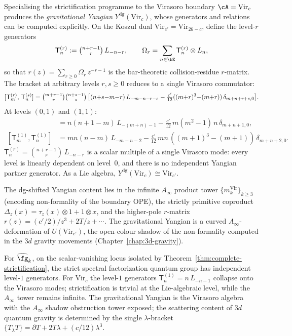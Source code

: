 \begin{remark}%
\label{rem:gravitational-yangian-explicit-brackets}%
\ClaimStatusProvedHere
Specialising the strictification programme to the Virasoro boundary
$\cA = \mathrm{Vir}_c$ produces the \emph{gravitational Yangian}
$Y^{\mathrm{dg}}(\mathrm{Vir}_c)$, whose generators and relations
can be computed explicitly. On the Koszul dual
$\mathrm{Vir}_{c'} = \mathrm{Vir}_{26-c}$, define the level-$r$
generators
\[
\mathsf{T}_n^{(r)} := \tbinom{n+r-1}{r}\,L_{-n-r},
\qquad
\Omega_r = \sum_{n \in \bZ}
\mathsf{T}_n^{(r)} \otimes L_n,
\]
so that $r(z) = \sum_{r \ge 0}\Omega_r\,z^{-r-1}$ is the bar-theoretic
collision-residue $r$-matrix. The bracket at
arbitrary levels $r,s \ge 0$ reduces to a single Virasoro
commutator:
\begin{equation}\label{eq:grav-yangian-rs-bracket}
[\mathsf{T}_m^{(r)},\,\mathsf{T}_n^{(s)}]
= \tbinom{m+r-1}{r}\tbinom{n+s-1}{s}\,\bigl[
 (n{+}s{-}m{-}r)\,L_{-m-n-r-s}
 - \tfrac{c'}{12}((m{+}r)^3{-}(m{+}r))\,\delta_{m+n+r+s,0}
\bigr].
\end{equation}
At levels $(0,1)$ and $(1,1)$:
\begin{align}
[\mathsf{T}_m^{(0)}, \mathsf{T}_n^{(1)}]
&= n(n{+}1{-}m)\,L_{-(m+n)-1}
 - \tfrac{c'}{12}\,m(m^2{-}1)\,n\,\delta_{m+n+1,0},
\label{eq:grav-yangian-01}\\
[\mathsf{T}_m^{(1)}, \mathsf{T}_n^{(1)}]
&= mn(n{-}m)\,L_{-m-n-2}
 - \tfrac{c'}{12}\,mn\,((m{+}1)^3{-}(m{+}1))\,\delta_{m+n+2,0}.
\label{eq:grav-yangian-11}
\end{align}
$\mathsf{T}_n^{(r)} = \binom{n+r-1}{r}\,L_{-n-r}$ is a scalar multiple
of a single Virasoro mode: every level is linearly dependent on
level~$0$, and there is no independent Yangian partner generator. As a
Lie algebra, $Y^{\mathrm{dg}}(\mathrm{Vir}_c) \cong \mathrm{Vir}_{c'}$.

The dg-shifted Yangian content lies in the infinite $A_\infty$ product
tower $\{m_k^{\mathrm{Vir}}\}_{k \ge 3}$ (encoding non-formality of the
boundary OPE), the strictly primitive coproduct
$\Delta_z(x) = \tau_z(x) \otimes 1 + 1 \otimes x$, and the higher-pole
$r$-matrix $r(z) = (c'/2)/z^3 + 2T/z + \cdots$. The gravitational
Yangian is a curved $A_\infty$-deformation of $U(\mathrm{Vir}_{c'})$,
the open-colour shadow of the non-formality computed in the $3d$
gravity movements (Chapter~\ref{chap:3d-gravity}).

For $\widehat{\fg}_k$, on the scalar-vanishing locus isolated by
Theorem~\ref{thm:complete-strictification}, the strict spectral
factorization quantum group has independent level-$1$ generators. For
$\mathrm{Vir}_c$ the level-$1$ generators
$\mathsf{T}_n^{(1)} = n\,L_{-n-1}$ collapse onto the Virasoro modes;
strictification is trivial at the Lie-algebraic level, while the
$A_\infty$ tower remains infinite. The gravitational Yangian is the
Virasoro algebra with the $A_\infty$ shadow obstruction tower exposed;
the scattering content of $3d$ quantum gravity is determined by the
single $\lambda$-bracket
$\{T{}_\lambda T\} = \partial T + 2T\lambda + (c/12)\lambda^3$.
\end{remark}

